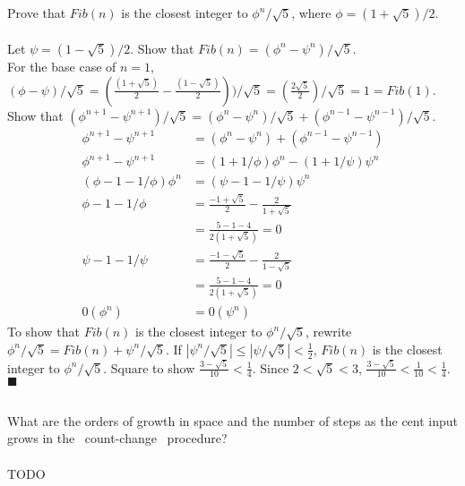 \documentclass{article}
\begin{document}
\subsection{}
Prove that $Fib(n)$ is the closest integer to $\phi^n/\sqrt{5}$, where $\phi = (1 + \sqrt{5})/2$.\\ \\
Let $\psi = (1 - \sqrt{5})/2$. Show that $Fib(n) = (\phi^n - \psi^n)/\sqrt{5}$.\\
For the base case of $n = 1$, $(\phi - \psi)/\sqrt{5} = (\frac{(1 + \sqrt{5})}{2} - \frac{(1 - \sqrt{5})}{2}))/\sqrt{5} = (\frac{2\sqrt{5}}{2})/\sqrt{5} = 1 = Fib(1)$.\\
Show that $(\phi^{n+1} - \psi^{n+1})/\sqrt{5} = (\phi^n - \psi^n)/\sqrt{5} + (\phi^{n-1} - \psi^{n-1})/\sqrt{5}$.
\begin{align}
\phi^{n+1} - \psi^{n+1} &= (\phi^n - \psi^n) + (\phi^{n-1} - \psi^{n-1})\\
\phi^{n+1} - \psi^{n+1} &= (1 + 1/\phi)\phi^n - (1 + 1/\psi)\psi^n\\
(\phi - 1 - 1/\phi)\phi^n &= (\psi - 1 - 1/\psi)\psi^n\\
\phi - 1 - 1/\phi &= \frac{-1 + \sqrt{5}}{2} - \frac{2}{1 + \sqrt{5}}\\
                  &= \frac{5 - 1 - 4}{2(1 + \sqrt{5})} = 0\\
\psi - 1 - 1/\psi &= \frac{-1 - \sqrt{5}}{2} - \frac{2}{1 - \sqrt{5}}\\
                  &= \frac{5 - 1 - 4}{2(1 + \sqrt{5})} = 0\\
0(\phi^n) &= 0(\psi^n)
\end{align}
To show that $Fib(n)$ is the closest integer to $\phi^n/\sqrt{5}$, rewrite $\phi^n/\sqrt{5} = Fib(n) + \psi^n/\sqrt{5}$. If $|\psi^n/\sqrt{5}| \leq |\psi/\sqrt{5}| < \frac{1}{2}$, $Fib(n)$ is the closest integer to $\phi^n/\sqrt{5}$. Square to show $\frac{3-\sqrt{5}}{10} < \frac{1}{4}$. Since $2 < \sqrt{5} < 3$, $\frac{3-\sqrt{5}}{10} < \frac{1}{10} < \frac{1}{4}$. $\blacksquare$

\subsection{}
What are the orders of growth in space and the number of steps as the cent input grows in the ~count-change~ procedure?\\ \\
TODO

\end{document}
